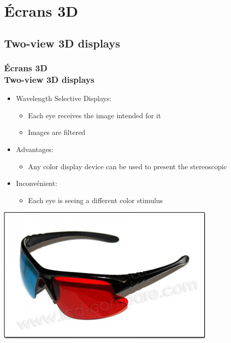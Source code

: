 
\section{Écrans 3D}
\subsection{Two-view 3D displays}
\begin{frame}

  \frametitle{Écrans 3D \\Two-view 3D displays} 
  
  \begin{itemize}
  \item Wavelength Selective Displays:
    
    \begin{itemize}
    \item Each eye receives the image intended for it
    \item Images are filtered	
    \end{itemize}
    
    
    
  \item Advantages:
    \begin{itemize} 	
    \item Any color display device can be used to present the stereoscopic
    \end{itemize}
  \item Inconvénient:
    \begin{itemize} 
    \item Each eye is seeing a different color stimulus
    \end{itemize}
  \end{itemize}
  \includegraphics[keepaspectratio,height=.13\linewidth]{1.jpg}
\end{frame}


